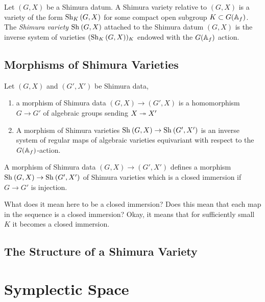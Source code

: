 \documentclass[12pt]{article}
\begin{document}
\begin{defn}
Let $(G, X)$ be a Shimura datum. A Shimura variety relative to $(G, X)$ is a variety of the form $\mathrm{Sh}_{K} \left( G, X \right)$ for some compact open subgroup $K \subset G(\mathbb{A}_f)$.
\bigskip\\
The \textit{Shimura variety} $\mathrm{Sh}_{} \left( G, X \right)$ attached to the Shimura datum $(G, X)$ is the inverse system of varieties $(\mathrm{Sh}_{K} \left( G, X \right))_K$ endowed with the $G(\mathbb{A}_f)$ action.  
\end{defn}

\subsection{Morphisms of Shimura Varieties}

\begin{defn}
Let $(G, X)$ and $(G', X')$ be Shimura data, 
\begin{enumerate}
\item a morphism of Shimura data $(G, X) \to (G', X)$ is a homomorphism $G \to G'$ of algebraic groups sending $X \twoheadrightarrow X'$
\item A morphism of Shimura varieties $\mathrm{Sh}_{} \left( G, X \right) \to \mathrm{Sh}_{} \left( G', X' \right)$ is an inverse system of regular maps of algebraic varieties equivariant with respect to the $G(\mathbb{A}_f)$-action.
\end{enumerate}
\end{defn}

\begin{thm}
A morphism of Shimura data $(G, X) \to (G', X')$ defines a morphism $\mathrm{Sh}_{} \left( G, X \right) \to \mathrm{Sh}_{} \left( G', X' \right)$ of Shimura varieties which is a closed immersion if $G \to G'$ is injection.
\end{thm}

\begin{rmk}
What does it mean here to be a closed immersion? Does this mean that each map in the sequence is a closed immersion? Okay, it means that for sufficiently small $K$ it becomes a closed immersion. 
\end{rmk}

\subsection{The Structure of a Shimura Variety}


\section{Symplectic Space}
\end{document}
